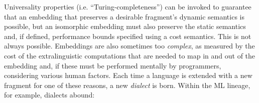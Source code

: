 \documentclass[10pt,preprint]{sigplanconf}
\begin{document}
Universality properties (i.e. ``Turing-completeness'') can be invoked to guarantee that an embedding that preserves a desirable fragment's dynamic semantics is possible, but an isomorphic embedding must also preserve the static semantics and, if defined, performance bounds specified using a cost semantics. This is not always possible. 
Embeddings are also sometimes too \emph{complex}, as measured by the cost of the extralinguistic computations that are needed to map in and out of the embedding and, if these  must be performed mentally by programmers, considering various human factors. %
Each time a language is extended with a new fragment for one of these reasons, a new \emph{dialect} is born. Within the ML lineage, for example, dialects abound:
%
\end{document}
